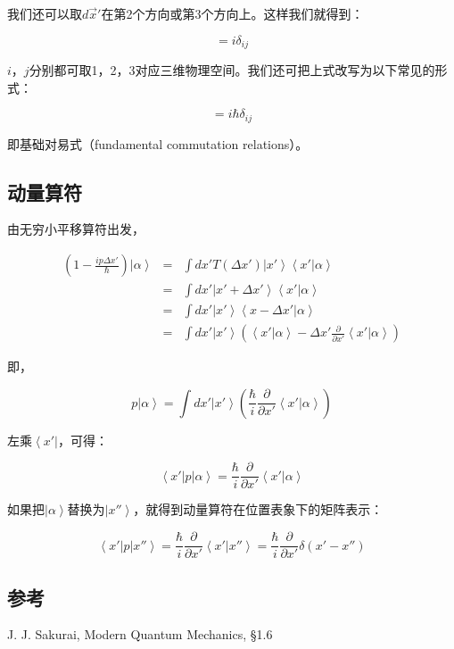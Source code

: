我们还可以取$d \vec x'$在第2个方向或第3个方向上。这样我们就得到：

\begin{equation}
[x_i , K_j ] = i \delta_{ij}
\end{equation}

$i$，$j$分别都可取1，2，3对应三维物理空间。我们还可把上式改写为以下常见的形式：

\begin{equation}
[x_i , p_j ] = i \hbar \delta_{ij}
\end{equation}

即基础对易式（fundamental commutation relations）。

\subsection{动量算符}

由无穷小平移算符出发，

\begin{eqnarray*}
\left( 1- \frac{i p \Delta x'}{\hbar}  \right) \left| \alpha \right\rangle & = & \int dx' T(\Delta x') \left| x' \right\rangle \left\langle x' | \alpha \right\rangle \\
 {} & = & \int dx' \left| x' + \Delta x' \right\rangle \left\langle x' | \alpha \right\rangle  \\
 {} & = & \int dx' \left| x' \right\rangle \left\langle x- \Delta x' | \alpha \right\rangle \\
 {} & = & \int dx' \left| x' \right\rangle \left( \left\langle x' | \alpha \right\rangle - \Delta x' \frac{\partial }{\partial x'}  \left\langle x' | \alpha \right\rangle \right)
\end{eqnarray*}

即，

\begin{equation}
p \left| \alpha \right\rangle = \int dx' \left| x' \right\rangle \left( \frac{\hbar}{i} \frac{\partial }{\partial x'} \left\langle x' | \alpha \right\rangle  \right)
\end{equation}

左乘$\left\langle x' \right|$，可得：

\begin{equation}
\left\langle x' \right| p \left| \alpha \right\rangle = \frac{\hbar}{i } \frac{\partial }{\partial x'} \left\langle x' | \alpha \right\rangle
\end{equation}

如果把$\left| \alpha \right\rangle$替换为$\left| x'' \right\rangle$，就得到动量算符在位置表象下的矩阵表示：

\begin{equation}
\left\langle x' \right| p \left| x'' \right\rangle = \frac{\hbar}{i } \frac{\partial }{\partial x'} \left\langle x' | x'' \right\rangle = \frac{\hbar}{i } \frac{\partial }{\partial x'} \delta(x' - x'')
\end{equation}

\subsection*{参考}

J. J. Sakurai, Modern Quantum Mechanics, \S 1.6
